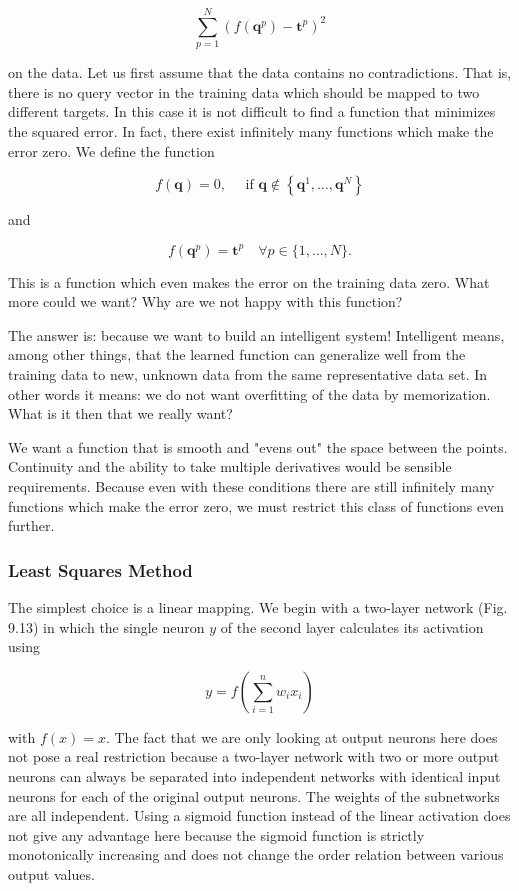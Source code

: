 \documentclass[10pt]{book}
\begin{document}
$$
\sum_{p=1}^{N}\left(f\left(\boldsymbol{q}^{p}\right)-\boldsymbol{t}^{p}\right)^{2}
$$

on the data. Let us first assume that the data contains no contradictions. That is, there is no query vector in the training data which should be mapped to two different targets. In this case it is not difficult to find a function that minimizes the squared error. In fact, there exist infinitely many functions which make the error zero. We define the function

$$
f(\boldsymbol{q})=0, \quad \text { if } \boldsymbol{q} \notin\left\{\boldsymbol{q}^{1}, \ldots, \boldsymbol{q}^{N}\right\}
$$

and

$$
f\left(\boldsymbol{q}^{p}\right)=\boldsymbol{t}^{p} \quad \forall p \in\{1, \ldots, N\} .
$$

This is a function which even makes the error on the training data zero. What more could we want? Why are we not happy with this function?

The answer is: because we want to build an intelligent system! Intelligent means, among other things, that the learned function can generalize well from the training data to new, unknown data from the same representative data set. In other words it means: we do not want overfitting of the data by memorization. What is it then that we really want?

We want a function that is smooth and "evens out" the space between the points. Continuity and the ability to take multiple derivatives would be sensible requirements. Because even with these conditions there are still infinitely many functions which make the error zero, we must restrict this class of functions even further.

\subsubsection*{Least Squares Method}
The simplest choice is a linear mapping. We begin with a two-layer network (Fig. 9.13) in which the single neuron $y$ of the second layer calculates its activation using


$$
y=f\left(\sum_{i=1}^{n} w_{i} x_{i}\right)
$$

with $f(x)=x$. The fact that we are only looking at output neurons here does not pose a real restriction because a two-layer network with two or more output neurons can always be separated into independent networks with identical input neurons for each of the original output neurons. The weights of the subnetworks are all independent. Using a sigmoid function instead of the linear activation does not give any advantage here because the sigmoid function is strictly monotonically increasing and does not change the order relation between various output values.
\end{document}

